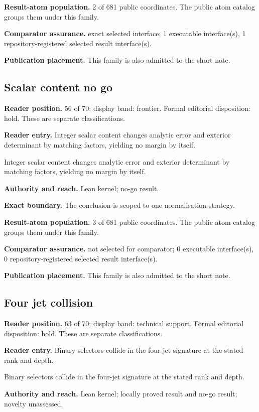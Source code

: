 \documentclass[11pt]{article}
\begin{document}
\textbf{Result-atom population.} 2 of 681 public coordinates. The public atom catalog groups them under this family.

\textbf{Comparator assurance.} exact selected interface; 1 executable interface(s), 1 repository-registered selected result interface(s).

\textbf{Publication placement.} This family is also admitted to the short note.

\subsection{Scalar content no go}
\textbf{Reader position.} 56 of 70; display band: frontier.  Formal editorial disposition: hold.  These are separate classifications.

\textbf{Reader entry.} Integer scalar content changes analytic error and exterior determinant by matching factors, yielding no margin by itself.

Integer scalar content changes analytic error and exterior determinant by matching factors, yielding no margin by itself.

\textbf{Authority and reach.} Lean kernel; no-go result.

\textbf{Exact boundary.} The conclusion is scoped to one normalisation strategy.

\textbf{Result-atom population.} 3 of 681 public coordinates. The public atom catalog groups them under this family.

\textbf{Comparator assurance.} not selected for comparator; 0 executable interface(s), 0 repository-registered selected result interface(s).

\textbf{Publication placement.} This family is also admitted to the short note.

\subsection{Four jet collision}
\textbf{Reader position.} 63 of 70; display band: technical support.  Formal editorial disposition: hold.  These are separate classifications.

\textbf{Reader entry.} Binary selectors collide in the four-jet signature at the stated rank and depth.

Binary selectors collide in the four-jet signature at the stated rank and depth.

\textbf{Authority and reach.} Lean kernel; locally proved result and no-go result; novelty unassessed.
\end{document}
